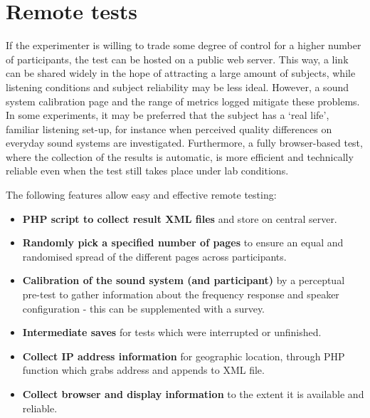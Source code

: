 \documentclass{sig-alternate}
\begin{document}
\section{Remote tests} %
	\label{sec:remote}

	If the experimenter is willing to trade some degree of control for a higher number of participants, the test can be hosted on a public web server. This way, a link can be shared widely in the hope of attracting a large amount of subjects, while listening conditions and subject reliability may be less ideal. However, a sound system calibration page and the range of metrics logged mitigate these problems. In some experiments, it may be preferred that the subject has a `real life', familiar listening set-up, for instance when perceived quality differences on everyday sound systems are investigated. 
	Furthermore, a fully browser-based test, where the collection of the results is automatic, is more efficient and technically reliable even when the test still takes place under lab conditions.

	The following features allow easy and effective remote testing: 
	\begin{itemize}[noitemsep,nolistsep] %
		\item \textbf{PHP script to collect result XML files} and store on central server.
		\item \textbf{Randomly pick a specified number of pages} to ensure an equal and randomised spread of the different pages across participants. 
		\item \textbf{Calibration of the sound system (and participant)} by a perceptual pre-test to gather information about the frequency response and speaker configuration - this can be supplemented with a survey.
		\item \textbf{Intermediate saves} for tests which were interrupted or unfinished.
		\item \textbf{Collect IP address information} for geographic location, through PHP function which grabs address and appends to XML file. 
		\item \textbf{Collect browser and display information} to the extent it is available and reliable. 
	\end{itemize}
\end{document}
